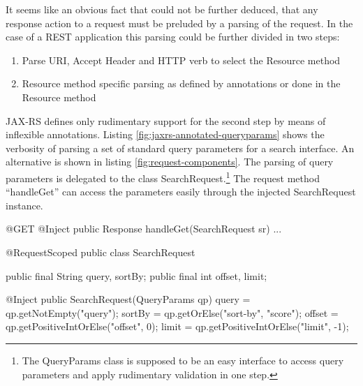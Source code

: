 \documentclass[12pt,a4paper]{scrartcl}		%
\begin{document}
It seems like an obvious fact that could not be further deduced, that any
response action to a request must be preluded by a parsing of the request. In
the case of a REST application this parsing could be further divided in two
steps:
\begin{enumerate}
\item Parse URI, Accept Header and HTTP verb to select the Resource method
\item Resource method specific parsing as defined by annotations or done in the
  Resource method
\end{enumerate}

JAX-RS defines only rudimentary support for the second step by means of
inflexible annotations. Listing \ref{fig:jaxrs-annotated-queryparams} shows the
verbosity of parsing a set of standard query parameters for a search
interface. An alternative is shown in listing \ref{fig:request-components}. The
parsing of query parameters is delegated to the class
SearchRequest.\footnote{The QueryParams class is supposed to be an easy
  interface to access query parameters and apply rudimentary validation in one
  step.} The request method ``handleGet'' can access the parameters easily
through the injected SearchRequest instance.

\begin{javalisting}[label=fig:jaxrs-annotated-queryparams,
                   caption={Verbosity of parsing Requests with JAX-RS}]
@Get public Response get(@QueryParam("query") String query,
                         @QueryParam("sort-by") String sortBy,
                         @QueryParam("offset") int offset,
                         @QueryParam("limit") int limit ) {
\end{javalisting}

\begin{javalisting}[label=fig:request-components,
                   caption={Separating Request parsing from the Resource method}]
@GET @Inject
public Response handleGet(SearchRequest sr) { ... }

@RequestScoped
public class SearchRequest {
    public final String query, sortBy;
    public final int offset, limit;
    
    @Inject public SearchRequest(QueryParams qp) {
        query = qp.getNotEmpty("query");
        sortBy = qp.getOrElse("sort-by", "score");
        offset = qp.getPositiveIntOrElse("offset", 0);
        limit = qp.getPositiveIntOrElse("limit", -1);
    }
}
\end{javalisting}
\end{document}
